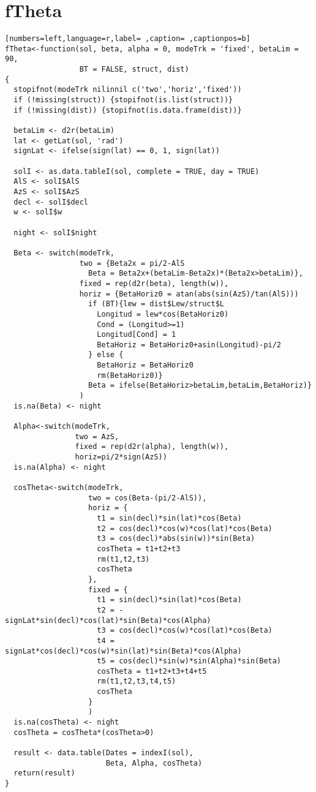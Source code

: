 \section{fTheta}
\label{sec:org72a9c7c}
\begin{lstlisting}[numbers=left,language=r,label= ,caption= ,captionpos=b]
fTheta<-function(sol, beta, alpha = 0, modeTrk = 'fixed', betaLim = 90, 
                 BT = FALSE, struct, dist)
{
  stopifnot(modeTrk nilinnil c('two','horiz','fixed'))
  if (!missing(struct)) {stopifnot(is.list(struct))}
  if (!missing(dist)) {stopifnot(is.data.frame(dist))}

  betaLim <- d2r(betaLim)
  lat <- getLat(sol, 'rad')
  signLat <- ifelse(sign(lat) == 0, 1, sign(lat)) 

  solI <- as.data.tableI(sol, complete = TRUE, day = TRUE)
  AlS <- solI$AlS
  AzS <- solI$AzS
  decl <- solI$decl
  w <- solI$w

  night <- solI$night

  Beta <- switch(modeTrk,
                 two = {Beta2x = pi/2-AlS	
                   Beta = Beta2x+(betaLim-Beta2x)*(Beta2x>betaLim)},
                 fixed = rep(d2r(beta), length(w)), 
                 horiz = {BetaHoriz0 = atan(abs(sin(AzS)/tan(AlS)))
                   if (BT){lew = dist$Lew/struct$L
                     Longitud = lew*cos(BetaHoriz0)
                     Cond = (Longitud>=1)
                     Longitud[Cond] = 1
                     BetaHoriz = BetaHoriz0+asin(Longitud)-pi/2                                     
                   } else {
                     BetaHoriz = BetaHoriz0
                     rm(BetaHoriz0)}
                   Beta = ifelse(BetaHoriz>betaLim,betaLim,BetaHoriz)}
                 )
  is.na(Beta) <- night

  Alpha<-switch(modeTrk,
                two = AzS,
                fixed = rep(d2r(alpha), length(w)),
                horiz=pi/2*sign(AzS))
  is.na(Alpha) <- night

  cosTheta<-switch(modeTrk,
                   two = cos(Beta-(pi/2-AlS)),
                   horiz = {
                     t1 = sin(decl)*sin(lat)*cos(Beta)      
                     t2 = cos(decl)*cos(w)*cos(lat)*cos(Beta)   
                     t3 = cos(decl)*abs(sin(w))*sin(Beta)   
                     cosTheta = t1+t2+t3
                     rm(t1,t2,t3)
                     cosTheta
                   },
                   fixed = {
                     t1 = sin(decl)*sin(lat)*cos(Beta)      
                     t2 = -signLat*sin(decl)*cos(lat)*sin(Beta)*cos(Alpha) 
                     t3 = cos(decl)*cos(w)*cos(lat)*cos(Beta)   
                     t4 = signLat*cos(decl)*cos(w)*sin(lat)*sin(Beta)*cos(Alpha) 
                     t5 = cos(decl)*sin(w)*sin(Alpha)*sin(Beta)   
                     cosTheta = t1+t2+t3+t4+t5
                     rm(t1,t2,t3,t4,t5)
                     cosTheta
                   }
                   )
  is.na(cosTheta) <- night
  cosTheta = cosTheta*(cosTheta>0) 

  result <- data.table(Dates = indexI(sol),
                       Beta, Alpha, cosTheta)
  return(result)
}
\end{lstlisting}

